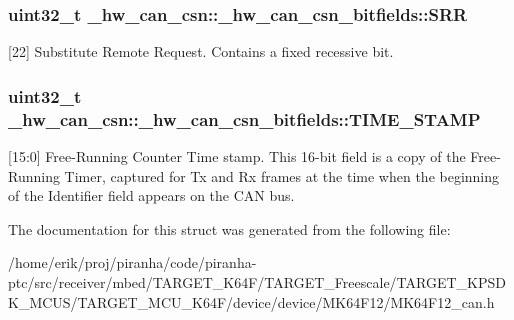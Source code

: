 \subsubsection[{\texorpdfstring{S\+RR}{SRR}}]{\setlength{\rightskip}{0pt plus 5cm}uint32\+\_\+t \+\_\+hw\+\_\+can\+\_\+csn\+::\+\_\+hw\+\_\+can\+\_\+csn\+\_\+bitfields\+::\+S\+RR}\hypertarget{struct__hw__can__csn_1_1__hw__can__csn__bitfields_ac93774a2aba9efab06305b036c5a2cbc}{}\label{struct__hw__can__csn_1_1__hw__can__csn__bitfields_ac93774a2aba9efab06305b036c5a2cbc}
\mbox{[}22\mbox{]} Substitute Remote Request. Contains a fixed recessive bit. 
\subsubsection[{\texorpdfstring{T\+I\+M\+E\+\_\+\+S\+T\+A\+MP}{TIME_STAMP}}]{\setlength{\rightskip}{0pt plus 5cm}uint32\+\_\+t \+\_\+hw\+\_\+can\+\_\+csn\+::\+\_\+hw\+\_\+can\+\_\+csn\+\_\+bitfields\+::\+T\+I\+M\+E\+\_\+\+S\+T\+A\+MP}\hypertarget{struct__hw__can__csn_1_1__hw__can__csn__bitfields_ac32fbe6cd02d09d7cd03b040f9ae8195}{}\label{struct__hw__can__csn_1_1__hw__can__csn__bitfields_ac32fbe6cd02d09d7cd03b040f9ae8195}
\mbox{[}15\+:0\mbox{]} Free-\/\+Running Counter Time stamp. This 16-\/bit field is a copy of the Free-\/\+Running Timer, captured for Tx and Rx frames at the time when the beginning of the Identifier field appears on the C\+AN bus. 

The documentation for this struct was generated from the following file\+:\begin{DoxyCompactItemize}
\item 
/home/erik/proj/piranha/code/piranha-\/ptc/src/receiver/mbed/\+T\+A\+R\+G\+E\+T\+\_\+\+K64\+F/\+T\+A\+R\+G\+E\+T\+\_\+\+Freescale/\+T\+A\+R\+G\+E\+T\+\_\+\+K\+P\+S\+D\+K\+\_\+\+M\+C\+U\+S/\+T\+A\+R\+G\+E\+T\+\_\+\+M\+C\+U\+\_\+\+K64\+F/device/device/\+M\+K64\+F12/M\+K64\+F12\+\_\+can.\+h\end{DoxyCompactItemize}
